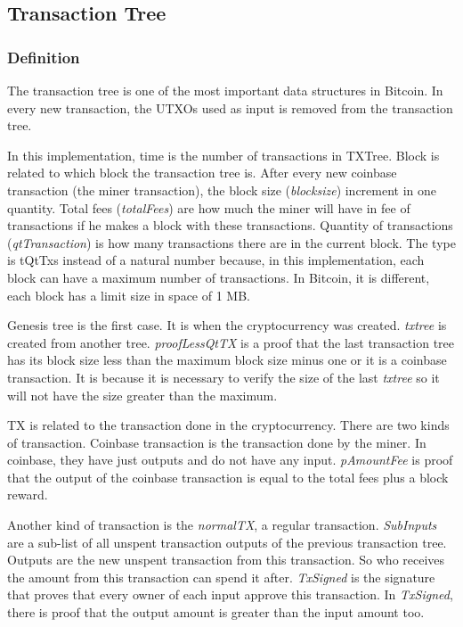 \subsection{Transaction Tree}

\subsubsection{Definition}

The transaction tree is one of the most important data structures in Bitcoin.
In every new transaction, the UTXOs used as input is removed from the transaction tree.


In this implementation, time is the number of transactions in TXTree.
Block is related to which block the transaction tree is.
After every new coinbase transaction (the miner transaction), the block size (\emph{blocksize}) increment in one quantity.
Total fees (\emph{totalFees}) are how much the miner will have in fee of transactions if he makes a block with these
transactions.
Quantity of transactions (\emph{qtTransaction}) is how many transactions there are in the current block.
The type is tQtTxs instead of a natural number because, in this implementation, each block can have
a maximum number of transactions.
In Bitcoin, it is different, each block has a limit size in space of 1 MB.

Genesis tree is the first case.
It is when the cryptocurrency was created.
\emph{txtree} is created from another tree.
\emph{proofLessQtTX} is a proof that the last transaction tree has its
block size less than the maximum block size minus one or it is a coinbase transaction.
It is because it is necessary to verify the size of the last \emph{txtree} so it will not have
the size greater than the maximum.


TX is related to the transaction done in the cryptocurrency.
There are two kinds of transaction.
Coinbase transaction is the transaction done by the miner.
In coinbase, they have just outputs and do not have any input.
\emph{pAmountFee} is proof that the output of the coinbase transaction is equal to the total fees plus
a block reward.

Another kind of transaction is the \emph{normalTX}, a regular transaction.
\emph{SubInputs} are a sub-list of all unspent transaction outputs of the previous transaction tree.
Outputs are the new unspent transaction from this transaction.
So who receives the amount from this transaction can spend it after.
\emph{TxSigned} is the signature that proves that every owner of each input approve this transaction.
In \emph{TxSigned}, there is proof that the output amount is greater than the input amount too.

